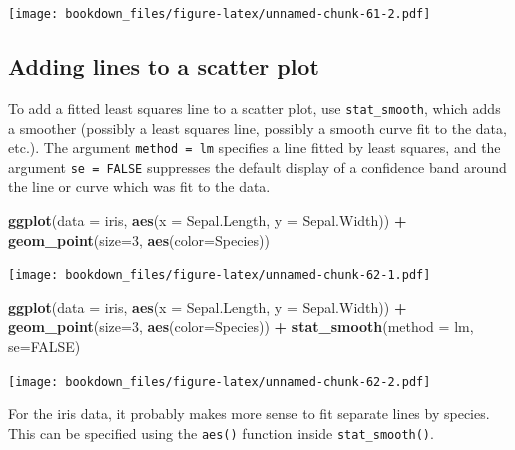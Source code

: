 \documentclass[]{krantz}
\makeatletter
\newenvironment{Shaded}{\begin{snugshade}}{\end{snugshade}}
\newcommand{\KeywordTok}[1]{\textcolor[rgb]{0.27,0.27,0.27}{\textbf{#1}}}
\newcommand{\DataTypeTok}[1]{\textcolor[rgb]{0.27,0.27,0.27}{#1}}
\newcommand{\DecValTok}[1]{\textcolor[rgb]{0.06,0.06,0.06}{#1}}
\newcommand{\StringTok}[1]{\textcolor[rgb]{0.5,0.5,0.5}{#1}}
\newcommand{\OtherTok}[1]{\textcolor[rgb]{0.37,0.37,0.37}{#1}}
\newcommand{\OperatorTok}[1]{\textcolor[rgb]{0.43,0.43,0.43}{\textbf{#1}}}
\newcommand{\NormalTok}[1]{#1}
\newenvironment{kframe}{%
\medskip{}
\setlength{\fboxsep}{.8em}
 \def\at@end@of@kframe{}%
 \ifinner\ifhmode%
  \def\at@end@of@kframe{\end{minipage}}%
  \begin{minipage}{\columnwidth}%
 \fi\fi%
 \def\FrameCommand##1{\hskip\@totalleftmargin \hskip-\fboxsep
 \colorbox{shadecolor}{##1}\hskip-\fboxsep
     \hskip-\linewidth \hskip-\@totalleftmargin \hskip\columnwidth}%
 \MakeFramed {\advance\hsize-\width
   \@totalleftmargin\z@ \linewidth\hsize
   \@setminipage}}%
 {\par\unskip\endMakeFramed%
 \at@end@of@kframe}
\renewenvironment{Shaded}{\begin{kframe}}{\end{kframe}}
\makeatother
\begin{document}
\texttt{[image: bookdown\_files/figure-latex/unnamed-chunk-61-2.pdf]}

\subsection{Adding lines to a scatter
plot}\label{adding-lines-to-a-scatter-plot}

To add a fitted least squares line to a scatter plot, use
\texttt{stat\_smooth}, which adds a smoother (possibly a least squares
line, possibly a smooth curve fit to the data, etc.). The argument
\texttt{method\ =\ lm} specifies a line fitted by least squares, and the
argument \texttt{se\ =\ FALSE} suppresses the default display of a
confidence band around the line or curve which was fit to the data.

\begin{Shaded}
\begin{Highlighting}[]
\KeywordTok{ggplot}\NormalTok{(}\DataTypeTok{data =}\NormalTok{ iris, }\KeywordTok{aes}\NormalTok{(}\DataTypeTok{x =}\NormalTok{ Sepal.Length, }\DataTypeTok{y =}\NormalTok{ Sepal.Width)) }\OperatorTok{+}\StringTok{ }
\StringTok{    }\KeywordTok{geom_point}\NormalTok{(}\DataTypeTok{size=}\DecValTok{3}\NormalTok{, }\KeywordTok{aes}\NormalTok{(}\DataTypeTok{color=}\NormalTok{Species))}
\end{Highlighting}
\end{Shaded}

\texttt{[image: bookdown\_files/figure-latex/unnamed-chunk-62-1.pdf]}

\begin{Shaded}
\begin{Highlighting}[]
\KeywordTok{ggplot}\NormalTok{(}\DataTypeTok{data =}\NormalTok{ iris, }\KeywordTok{aes}\NormalTok{(}\DataTypeTok{x =}\NormalTok{ Sepal.Length, }\DataTypeTok{y =}\NormalTok{ Sepal.Width)) }\OperatorTok{+}\StringTok{ }
\StringTok{    }\KeywordTok{geom_point}\NormalTok{(}\DataTypeTok{size=}\DecValTok{3}\NormalTok{, }\KeywordTok{aes}\NormalTok{(}\DataTypeTok{color=}\NormalTok{Species)) }\OperatorTok{+}\StringTok{ }
\StringTok{    }\KeywordTok{stat_smooth}\NormalTok{(}\DataTypeTok{method =}\NormalTok{ lm, }\DataTypeTok{se=}\OtherTok{FALSE}\NormalTok{)}
\end{Highlighting}
\end{Shaded}

\texttt{[image: bookdown\_files/figure-latex/unnamed-chunk-62-2.pdf]}

For the iris data, it probably makes more sense to fit separate lines by
species. This can be specified using the \texttt{aes()} function inside
\texttt{stat\_smooth()}.
\end{document}
